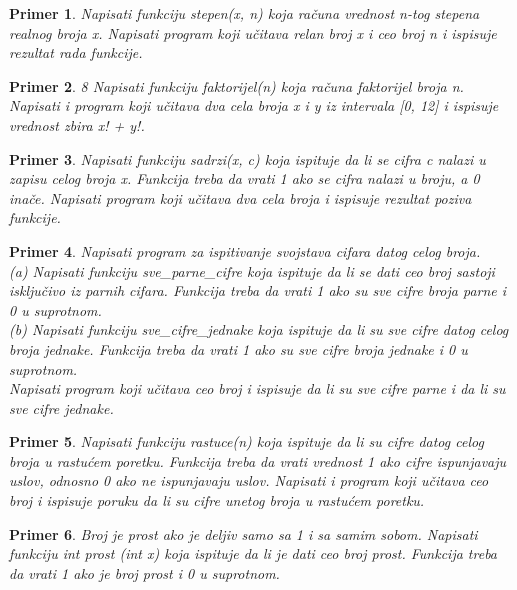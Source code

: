 \documentclass[a4paper]{article}
\newtheorem{primer}{Primer}[section]
\begin{document}
\begin{primer}
Napisati funkciju stepen(x, n) koja
računa vrednost n-tog stepena realnog broja x. Napisati program koji učitava
relan broj x i ceo broj n i ispisuje rezultat rada funkcije.
\end{primer}

\begin{primer}
8 Napisati funkciju faktorijel(n) koja računa
faktorijel broja n. Napisati i program koji učitava dva cela broja x i y iz intervala
[0, 12] i ispisuje vrednost zbira x! + y!.
\end{primer}

\begin{primer}
Napisati funkciju sadrzi(x, c) koja ispituje
da li se cifra c nalazi u zapisu celog broja x. Funkcija treba da vrati 1 ako se cifra
nalazi u broju, a 0 inače. Napisati program koji učitava dva cela broja i ispisuje
rezultat poziva funkcije.
\end{primer}

\begin{primer}
Napisati program za ispitivanje svojstava cifara datog celog
broja.\\
(a) Napisati funkciju sve\_parne\_cifre koja ispituje da li se dati ceo broj sastoji
isključivo iz parnih cifara. Funkcija treba da vrati 1 ako su sve cifre
broja parne i 0 u suprotnom.\\
(b) Napisati funkciju sve\_cifre\_jednake koja ispituje da li su sve cifre datog
celog broja jednake. Funkcija treba da vrati 1 ako su sve cifre broja jednake
i 0 u suprotnom.\\
Napisati program koji učitava ceo broj i ispisuje da li su sve cifre parne i da li su
sve cifre jednake.
\end{primer}

\begin{primer}
Napisati funkciju rastuce(n) koja ispituje da li
su cifre datog celog broja u rastućem poretku. Funkcija treba da vrati vrednost
1 ako cifre ispunjavaju uslov, odnosno 0 ako ne ispunjavaju uslov. Napisati i
program koji učitava ceo broj i ispisuje poruku da li su cifre unetog broja u
rastućem poretku.
\end{primer}

\begin{primer}
Broj je prost ako je deljiv samo sa 1 i sa samim sobom.
Napisati funkciju int prost (int x) koja ispituje da li je dati ceo broj prost.
Funkcija treba da vrati 1 ako je broj prost i 0 u suprotnom. 
\end{primer}
\end{document}
